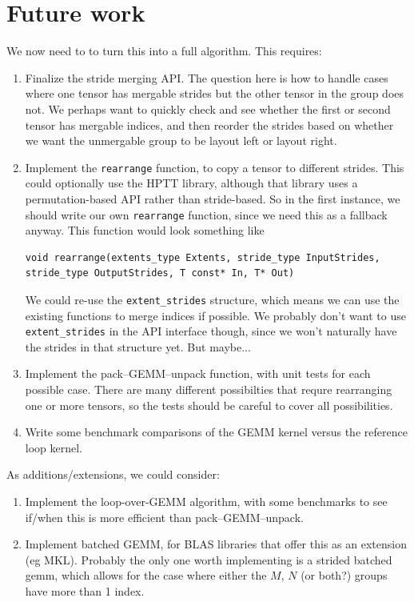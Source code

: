 \documentclass[11pt]{article}
\begin{document}
\section{Future work}

We now need to to turn this into a full algorithm. This requires:
\begin{enumerate}
  \item Finalize the stride merging API. The question here is how to handle cases where one tensor has mergable strides
  but the other tensor in the group does not. We perhaps want to quickly check and see whether the first or second tensor
  has mergable indices, and then reorder the strides based on whether we want the unmergable group to be layout left or
  layout right.
  \item Implement the \texttt{rearrange} function, to copy a tensor to different strides. This could optionally use the HPTT library,
  although that library uses a permutation-based API rather than stride-based. So in the first instance, we should write our own
  \texttt{rearrange} function, since we need this as a fallback anyway.  This function would look something like
  \begin{lstlisting}
void rearrange(extents_type Extents, stride_type InputStrides, stride_type OutputStrides, T const* In, T* Out)
  \end{lstlisting}
  We could re-use the \texttt{extent\_strides} structure, which means we can use the existing functions to merge indices if possible.
  We probably don't want to use \texttt{extent\_strides} in the API interface though, since we won't naturally have the strides
  in that structure yet. But maybe...
  \item Implement the pack--GEMM--unpack function, with unit tests for each possible case. There are many different possibilties
  that requre rearranging one or more tensors, so the tests should be careful to cover all possibilities.
  \item Write some benchmark comparisons of the GEMM kernel versus the reference loop kernel.
\end{enumerate}

As additions/extensions, we could consider:
\begin{enumerate}
  \item Implement the loop-over-GEMM algorithm, with some benchmarks to see if/when this is more efficient than pack--GEMM--unpack.
  \item Implement batched GEMM, for BLAS libraries that offer this as an extension (eg MKL). Probably the only one worth implementing
  is a strided batched gemm, which allows for the case where either the $M$, $N$ (or both?) groups have more than 1 index.
\end{enumerate}
\end{document}
